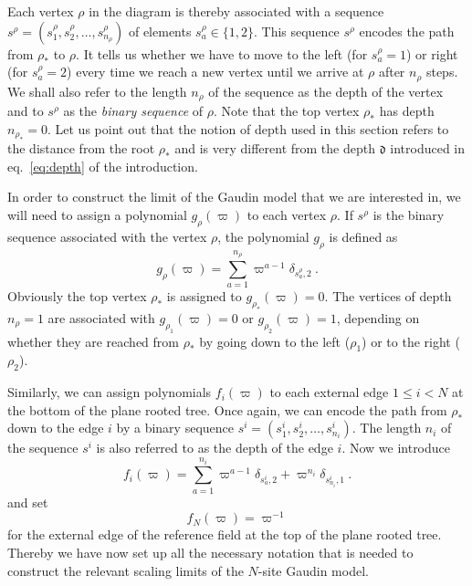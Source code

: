 \documentclass{article}
\def\dep{\mathfrak{d}}
\begin{document}
Each vertex $\rho$ in the diagram is thereby associated with a sequence $s^\rho = 
(s^\rho_1,s^\rho_2, \dots, s^\rho_{n_\rho})$ of elements $s^\rho_a \in \{1,2\}$. This sequence 
$s^\rho$ encodes the path from $\rho_\ast$ to $\rho$. It tells us whether we have to 
move to the left (for $s_a^\rho=1$) or right (for $s_a^\rho=2$) every time we reach a new vertex until we arrive at $\rho$ after 
$n_\rho$ steps. We shall also refer to the length $n_\rho$ of the sequence as the depth of the vertex and to $s^\rho$ as the \textit{binary sequence} of $\rho$. Note 
that the top vertex $\rho_\ast$ has depth $n_{\rho_\ast}=0$. Let us point out that 
the notion of depth used in this section refers to the distance from the root $\rho_\ast$ and is very different from the depth $\dep$ introduced 
in eq.\ \eqref{eq:depth} of the  introduction. 

In order to construct the limit of the Gaudin model that we are interested in, we will need to assign a polynomial $g_\rho(\varpi)$
to each vertex $\rho$. If $s^\rho$ is the binary sequence associated with the vertex $\rho$, 
the polynomial $g_\rho$ is defined as 
\begin{equation} \label{eq:grho}
g_\rho(\varpi) = \sum_{a=1}^{n_\rho} \varpi^{a-1} \delta_{s_a^\rho,2} \ . 
\end{equation} 
Obviously the top vertex $\rho_\ast$ is assigned to $g_{\rho_\ast}(\varpi) = 0$. 
The vertices of depth $n_\rho = 1$ are associated with $g_{\rho_1}(\varpi)= 0$ or 
$g_{\rho_2}(\varpi) = 1$, depending on whether they are reached from $\rho_\ast$
by going down to the left ($\rho_1$) or to the right ($\rho_2$). 

Similarly, we can assign polynomials $f_i(\varpi)$ to each external edge $1 \leq i<N$ at 
the bottom of the plane rooted tree. Once again, we can encode the path from $\rho_\ast$ 
down to the edge $i$ by a binary sequence $s^i = (s^i_1, s^i_2,  \dots, s_{n_i}^i)$. 
The length $n_i$ of the sequence $s^i$ is also referred to as the depth of the edge $i$. 
Now we introduce 
\begin{equation} \label{eq:fi} 
f_i(\varpi) = \sum_{a=1}^{n_i} \varpi^{a-1} \delta_{s^i_a,2} 
+ \varpi^{n_i}\delta_{s^i_{n_i},1}\ .  
\end{equation} 
and set 
\begin{equation}  \label{eq:wHighest} 
f_N(\varpi) = \varpi^{-1}
\end{equation} 
for the external edge of the reference field at the top of the plane 
rooted tree. Thereby we have now set up all the necessary notation that is needed to 
construct the relevant scaling limits of the $N$-site Gaudin model. 
\medskip 
\end{document}
